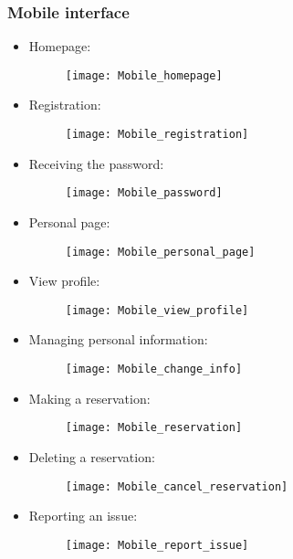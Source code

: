 \subsubsection{Mobile interface}
\begin{itemize}
	\item Homepage:
	\begin{figure}[H]
		\centering
		\texttt{[image: Mobile\_homepage]}
	\end{figure}
\newpage
\item Registration:
\begin{figure}[H]
	\centering
	\texttt{[image: Mobile\_registration]}
\end{figure}
\newpage
\item Receiving the password:
\begin{figure}[H]
	\centering
	\texttt{[image: Mobile\_password]}
\end{figure}
\newpage
\item Personal page:
\begin{figure}[H]
	\centering
	\texttt{[image: Mobile\_personal\_page]}
\end{figure}
\newpage
\item View profile:
\begin{figure}[H]
	\centering
	\texttt{[image: Mobile\_view\_profile]}
\end{figure}
\newpage
\item Managing personal information:
\begin{figure}[H]
	\centering
	\texttt{[image: Mobile\_change\_info]}
\end{figure}
\newpage
\item Making a reservation:
\begin{figure}[H]
	\centering
	\texttt{[image: Mobile\_reservation]}
\end{figure}
\newpage
\item Deleting a reservation:
\begin{figure}[H]
	\centering
	\texttt{[image: Mobile\_cancel\_reservation]}
\end{figure}
\newpage
\item Reporting an issue:
\begin{figure}[H]
	\centering
	\texttt{[image: Mobile\_report\_issue]}
\end{figure}
\end{itemize}
\newpage
